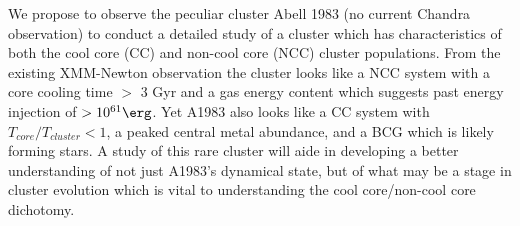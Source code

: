 We propose to observe the peculiar cluster Abell 1983 (no current
Chandra observation) to conduct a detailed study of a cluster which
has characteristics of both the cool core (CC) and non-cool core (NCC)
cluster populations. From the existing XMM-Newton observation the
cluster looks like a NCC system with a core cooling time $>$ 3 Gyr and
a gas energy content which suggests past energy injection of $>
10^{61} \erg$. Yet A1983 also looks like a CC system with
$T_{core}/T_{cluster} < 1$, a peaked central metal abundance, and a
BCG which is likely forming stars. A study of this rare cluster will
aide in developing a better understanding of not just A1983's
dynamical state, but of what may be a stage in cluster evolution which
is vital to understanding the cool core/non-cool core dichotomy.
